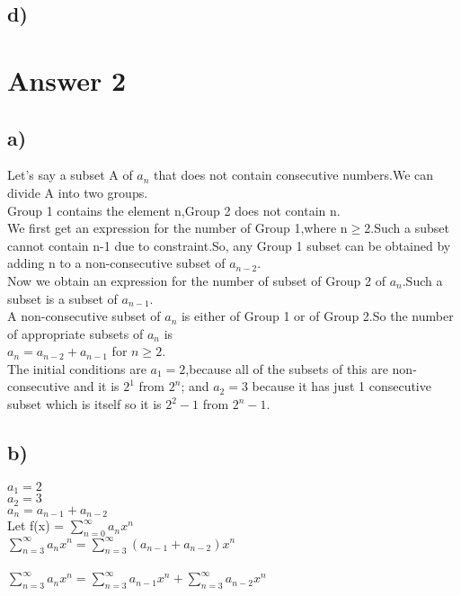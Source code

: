 \documentclass[12pt]{article}
\begin{document}
	\subsection*{d)}
	
	\section*{Answer 2}
	
	
	\subsection*{a)} 
	Let's say a subset A of $a_n$ that does not contain consecutive numbers.We can divide A into two groups.\\
	Group 1 contains the element n,Group 2 does not contain n.\\
	We first get an expression for the number of Group 1,where n$\geq$2.Such a subset cannot contain n-1 due to constraint.So, any Group 1 subset can be obtained by adding n to a non-consecutive subset of $a_{n-2}.$\\
	Now we obtain an expression for the number of subset of Group 2 of $a_n$.Such a subset is a subset of $a_{n-1}$.\\
	A non-consecutive subset of $a_n$ is either of Group 1 or of Group 2.So the number of appropriate subsets of $a_n$ is \\
	\hspace*{3cm}	$ a_n = a_{n-2} +a_{n-1} $ for $n\geq2$.\\
	The initial conditions are $a_1=2$,because all of the subsets of this are non-consecutive and it is $2^1$ from $2^n$; and $a_2=3$ because it has just 1 consecutive subset which is itself so it is $2^2-1$ from $2^n-1$.
	\subsection*{b)} 
	$a_1=2$\\
	$a_2=3$\\
	$a_n= a_{n-1}+a_{n-2}$\\
	Let f(x) = $\sum_{n=0}^{\infty} a_nx^n$ \\
	
	$\sum_{n=3}^{\infty} a_nx^n = \sum_{n=3}^{\infty} (a_{n-1}+a_{n-2})x^n $\\  \\
	$\sum_{n=3}^{\infty} a_nx^n=\sum_{n=3}^{\infty} a_{n-1}x^n + \sum_{n=3}^{\infty} a_{n-2}x^n $\\
	
\end{document}
